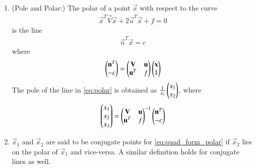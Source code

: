 \begin{enumerate}[label=\arabic*.,ref=\thesubsection.\theenumi]
\item (Pole and Polar:) The polar of a point $\vec{x}$ with respect to the curve
\begin{align}
\label{eq:quad_form_polar}
\vec{x}^T\vec{V}\vec{x}+2\vec{u}^T\vec{x}+f=0
\end{align}
is the line
\begin{align}
\label{eq:polar}
\vec{n}^T\vec{x} = c
\end{align}
%
where
\begin{align}
\begin{pmatrix}\mathbf{n}^T\\ - c\end{pmatrix}=
\begin{pmatrix}
\mathbf{V}&\mathbf{u}
\\
\mathbf{u}^T&f
\end{pmatrix}
\begin{pmatrix}\mathbf{x}\\1\end{pmatrix}
\end{align}
%
The pole of the line  in \eqref{eq:polar} is obtained as $\frac{1}{x_3}\begin{pmatrix}x_1\\x_2\end{pmatrix}$, where
\begin{align}
\begin{pmatrix}x_1 \\ x_2\\x_3\end{pmatrix}
=\begin{pmatrix}
\mathbf{V}&\mathbf{u}
\\
\mathbf{u}^T&f
\end{pmatrix}^{-1}
\begin{pmatrix}\mathbf{n}^T\\ - c\end{pmatrix}
\end{align}
\item $\vec{x}_1$ and $\vec{x}_2$ are said to be conjugate points for \eqref{eq:quad_form_polar} if $\vec{x}_2$ lies on the polar of $\vec{x}_1$ and vice-versa.  A similar definition holds for conjugate lines as well.

\end{enumerate}


